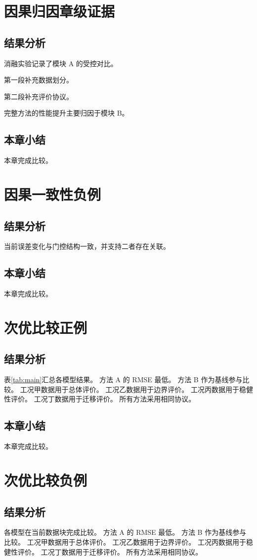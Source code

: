 \chapter{因果归因章级证据}
\section{结果分析}
消融实验记录了模块 A 的受控对比。

第一段补充数据划分。

第二段补充评价协议。

完整方法的性能提升主要归因于模块 B。
\section{本章小结}
本章完成比较。

\chapter{因果一致性负例}
\section{结果分析}
当前误差变化与门控结构一致，并支持二者存在关联。
\section{本章小结}
本章完成比较。

\chapter{次优比较正例}
\section{结果分析}
表\ref{tab:main}汇总各模型结果。
方法 A 的 RMSE 最低。
方法 B 作为基线参与比较。
工况甲数据用于总体评价。
工况乙数据用于边界评价。
工况丙数据用于稳健性评价。
工况丁数据用于迁移评价。
所有方法采用相同协议。
\section{本章小结}
本章完成比较。

\chapter{次优比较负例}
\section{结果分析}
各模型在当前数据块完成比较。
方法 A 的 RMSE 最低。
方法 B 作为基线参与比较。
工况甲数据用于总体评价。
工况乙数据用于边界评价。
工况丙数据用于稳健性评价。
工况丁数据用于迁移评价。
所有方法采用相同协议。

